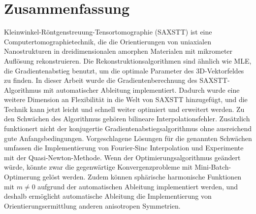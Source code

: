 \chapter*{Zusammenfassung}
Kleinwinkel-Röntgenstreuung-Tensortomographie (SAXSTT) ist eine Computertomographietechnik,
die die Orientierungen von uniaxialen Nanostrukturen in dreidimensionalen amorphen Materialen mit mikrometer Auflösung rekonstruieren.
Die Rekonstruktionsalgorithmen sind ähnlich wie MLE, die Gradientenabstieg benutzt, um die optimale Parameter des 3D-Vektorfeldes zu finden.
In dieser Arbeit wurde die Gradientenberechnung des SAXSTT-Algorithmus mit automatischer Ableitung implementiert.
Dadurch wurde eine weitere Dimension an Flexibilität in die Welt von SAXSTT hinzugefügt, und die Technik kann jetzt leicht und schnell weiter optimiert und erweitert werden.
Zu den Schwächen des Algorithmus gehören bilineare Interpolationsfehler.
Zusätzlich funktionert nicht der konjugertie Gradientenabstiegsalgorithmus ohne ausreichend gute Anfangsbedingungen.
Vorgeschlagene Lösungen für die genannten Schwächen umfassen die Implementierung von Fourier-Sinc Interpolation und Experimente mit der Quasi-Newton-Methode.
Wenn der Optimierungsalgorithmus geändert würde, könnte zwar die gegenwärtige Konvergenzprobleme mit Mini-Batch-Optimerung gelöst werden.
\noindent
Zudem können sphärische harmonische Funktionen mit $m \neq 0$ aufgrund der automatischen Ableitung implementiert werden,
und deshalb ermöglicht automatische Ableitung die Implementierung von Orientierungsermittlung anderen anisotropen Symmetrien.


\endgroup

\vfill
